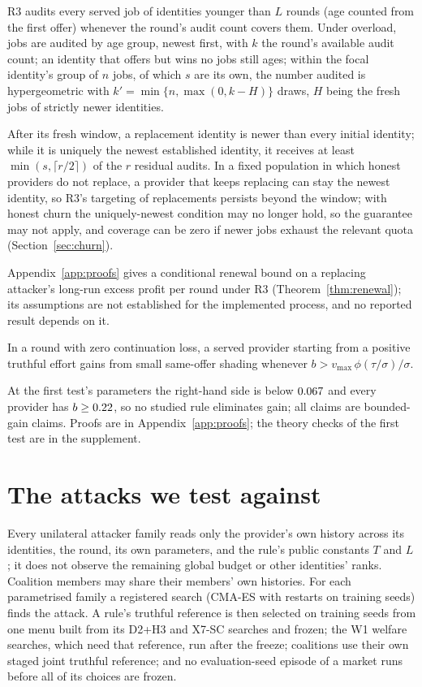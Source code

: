 \documentclass[11pt]{article}
\begin{document}
\begin{lemma}[coverage]\label{lem:coverage}
R3 audits every served job of identities younger than $L$ rounds (age counted from the first offer) whenever the round's audit count covers them. Under overload, jobs are audited by age group, newest first, with $k$ the round's available audit count; an identity that offers but wins no jobs still ages; within the focal identity's group of $n$ jobs, of which $s$ are its own, the number audited is hypergeometric with $k' = \min\{n, \max(0, k - H)\}$ draws, $H$ being the fresh jobs of strictly newer identities.
\end{lemma}

After its fresh window, a replacement identity is newer than every initial identity; while it is uniquely the newest established identity, it receives at least $\min(s, \lceil r/2 \rceil)$ of the $r$ residual audits. In a fixed population in which honest providers do not replace, a provider that keeps replacing can stay the newest identity, so R3's targeting of replacements persists beyond the window; with honest churn the uniquely-newest condition may no longer hold, so the guarantee may not apply, and coverage can be zero if newer jobs exhaust the relevant quota (Section~\ref{sec:churn}).

Appendix~\ref{app:proofs} gives a conditional renewal bound on a replacing attacker's long-run excess profit per round under R3 (Theorem~\ref{thm:renewal}); its assumptions are not established for the implemented process, and no reported result depends on it.

\begin{proposition}\label{prop:terminal}
In a round with zero continuation loss, a served provider starting from a positive truthful effort gains from small same-offer shading whenever $b > v_{\max}\,\phi(\tau/\sigma)/\sigma$.
\end{proposition}

At the first test's parameters the right-hand side is below $0.067$ and every provider has $b \ge 0.22$, so no studied rule eliminates gain; all claims are bounded-gain claims. Proofs are in Appendix~\ref{app:proofs}; the theory checks of the first test are in the supplement.

\section{The attacks we test against}\label{sec:attacks}
Every unilateral attacker family reads only the provider's own history across its identities, the round, its own parameters, and the rule's public constants $T$ and $L$; it does not observe the remaining global budget or other identities' ranks. Coalition members may share their members' own histories. For each parametrised family a registered search (CMA-ES with restarts on training seeds) finds the attack. A rule's truthful reference is then selected on training seeds from one menu built from its D2+H3 and X7-SC searches and frozen; the W1 welfare searches, which need that reference, run after the freeze; coalitions use their own staged joint truthful reference; and no evaluation-seed episode of a market runs before all of its choices are frozen.
\end{document}
